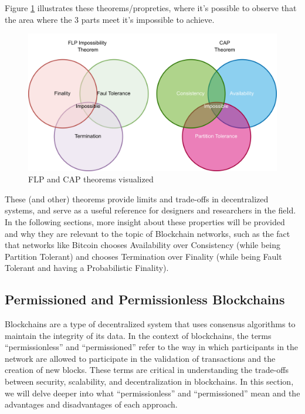 Figure \ref{fig:theorems} illustrates these theorems/propreties, where it's possible to observe that the area where the 3 parts meet it's impossible to achieve.

\begin{figure}[H]
    \centering
    \includegraphics[width=\textwidth,keepaspectratio]{imagens/flp-and-cap.png}
    \caption{FLP and CAP theorems visualized}
    \label{fig:theorems}

\end{figure}



These (and other) theorems provide limits and trade-offs in decentralized systems, and serve as a useful reference for designers and researchers in the field.
In the following sections, more insight about these properties will be provided and why they are relevant to the topic of Blockchain networks, such as the fact that networks like Bitcoin chooses Availability over Consistency (while being Partition Tolerant) and chooses Termination over Finality (while being Fault Tolerant and having a Probabilistic Finality).

\subsection*{Permissioned and Permissionless Blockchains}

Blockchains are a type of decentralized system that uses consensus algorithms to maintain the integrity of its data. In the context of blockchains, the terms ``permissionless'' and ``permissioned'' refer to the way in which participants in the network are allowed to participate in the validation of transactions and the creation of new blocks.
These terms are critical in understanding the trade-offs between security, scalability, and decentralization in blockchains. In this section, we will delve deeper into what ``permissionless'' and ``permissioned'' mean and the advantages and disadvantages of each approach.

